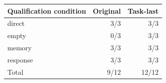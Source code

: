 \begin{tabular}{lrr}
\toprule
Qualification condition & Original & Task-last\\\midrule
direct & 3/3 & 3/3 \\
empty & 0/3 & 3/3 \\
memory & 3/3 & 3/3 \\
response & 3/3 & 3/3 \\
\midrule Total & 9/12 & 12/12\\
\bottomrule
\end{tabular}
